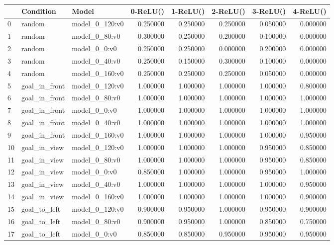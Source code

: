 \begin{tabular}{lllrrrrr}
\toprule
 & Condition & Model & 0-ReLU() & 1-ReLU() & 2-ReLU() & 3-ReLU() & 4-ReLU() \\
\midrule
0 & random & model\_0\_120:v0 & 0.250000 & 0.250000 & 0.250000 & 0.050000 & 0.000000 \\
1 & random & model\_0\_80:v0 & 0.300000 & 0.250000 & 0.200000 & 0.100000 & 0.000000 \\
2 & random & model\_0\_0:v0 & 0.250000 & 0.250000 & 0.000000 & 0.200000 & 0.000000 \\
3 & random & model\_0\_40:v0 & 0.250000 & 0.150000 & 0.300000 & 0.100000 & 0.000000 \\
4 & random & model\_0\_160:v0 & 0.250000 & 0.250000 & 0.250000 & 0.050000 & 0.000000 \\
5 & goal\_in\_front & model\_0\_120:v0 & 1.000000 & 1.000000 & 1.000000 & 1.000000 & 0.800000 \\
6 & goal\_in\_front & model\_0\_80:v0 & 1.000000 & 1.000000 & 1.000000 & 1.000000 & 1.000000 \\
7 & goal\_in\_front & model\_0\_0:v0 & 1.000000 & 1.000000 & 1.000000 & 1.000000 & 1.000000 \\
8 & goal\_in\_front & model\_0\_40:v0 & 1.000000 & 1.000000 & 1.000000 & 1.000000 & 1.000000 \\
9 & goal\_in\_front & model\_0\_160:v0 & 1.000000 & 1.000000 & 1.000000 & 1.000000 & 0.950000 \\
10 & goal\_in\_view & model\_0\_120:v0 & 1.000000 & 1.000000 & 1.000000 & 0.950000 & 0.850000 \\
11 & goal\_in\_view & model\_0\_80:v0 & 1.000000 & 1.000000 & 1.000000 & 0.950000 & 0.850000 \\
12 & goal\_in\_view & model\_0\_0:v0 & 0.850000 & 1.000000 & 1.000000 & 0.950000 & 1.000000 \\
13 & goal\_in\_view & model\_0\_40:v0 & 1.000000 & 1.000000 & 1.000000 & 1.000000 & 0.950000 \\
14 & goal\_in\_view & model\_0\_160:v0 & 1.000000 & 1.000000 & 1.000000 & 1.000000 & 0.900000 \\
15 & goal\_to\_left & model\_0\_120:v0 & 0.900000 & 0.950000 & 1.000000 & 0.950000 & 0.900000 \\
16 & goal\_to\_left & model\_0\_80:v0 & 0.900000 & 0.950000 & 1.000000 & 0.850000 & 0.750000 \\
17 & goal\_to\_left & model\_0\_0:v0 & 0.850000 & 0.850000 & 0.950000 & 0.950000 & 0.950000 \\

\end{tabular}
